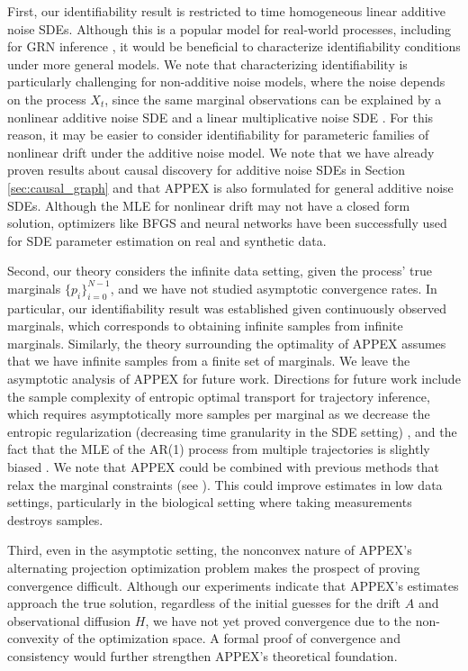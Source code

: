 \documentclass[twoside,11pt]{article}
\begin{document}
First, our identifiability result is restricted to time homogeneous linear additive noise SDEs. Although this is a popular model for real-world processes, including for GRN inference \citep{rohbeck2024bicycle, zhang2024joint}, it would be beneficial to characterize identifiability conditions under more general models. We note that characterizing identifiability is particularly challenging for non-additive noise models, where the noise depends on the process $X_t$, since the same marginal observations can be explained by a nonlinear additive noise SDE and a linear multiplicative noise SDE \citep{coomer2022noise}. For this reason, it may be easier to consider identifiability for parameteric families of nonlinear drift under the additive noise model. We note that we have already proven results about causal discovery for additive noise SDEs in Section \ref{sec:causal_graph} and that APPEX is also formulated for general additive noise SDEs.  Although the MLE for nonlinear drift may not have a closed form solution, optimizers like BFGS \citep{lavenant2021towards, chizat2022trajectory, wang2024generator} and neural networks \citep{shen2024learning} have been successfully used for SDE parameter estimation on real and synthetic data. 

Second, our theory considers the infinite data setting, given the process' true marginals $\{p_i\}_{i=0}^{N-1}$, and we have not studied asymptotic convergence rates. In particular, our identifiability result was established given continuously observed marginals, which corresponds to obtaining infinite samples from infinite marginals. Similarly, the theory surrounding the optimality of APPEX assumes that we have infinite samples from a finite set of marginals. We leave the asymptotic analysis of APPEX for future work. Directions for future work include the sample complexity of entropic optimal transport for trajectory inference, which requires asymptotically more samples per marginal as we decrease the entropic regularization (decreasing time granularity in the SDE setting) \citep[Theorem 3]{genevay2019sample}, and the fact that the MLE of the AR(1) process from multiple trajectories is slightly biased \citep{ledolter2009estimation}. We note that APPEX could be combined with previous methods that relax the marginal constraints (see \citet{lavenant2021towards}). This could improve estimates in low data settings, particularly in the biological setting where taking measurements destroys samples. 

Third, even in the asymptotic setting, the nonconvex nature of APPEX's alternating projection optimization problem makes the prospect of proving convergence difficult. Although our experiments indicate that APPEX's estimates approach the true solution, regardless of the initial guesses for the drift $A$ and observational diffusion $H$, we have not yet proved convergence due to the non-convexity of the optimization space. A formal proof of convergence and consistency would further strengthen APPEX's theoretical foundation.
\end{document}
